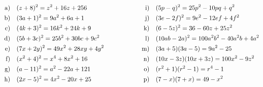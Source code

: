 \begin{exercise}
    {\small
    \begin{alignat*}{5}
      \solutionA & \qquad&\qquad & \solutionI \\
      \solutionB & \qquad&\qquad & \solutionJ \\
      \solutionC & \qquad&\qquad & \solutionK \\
      \solutionD & \qquad&\qquad & \solutionL \\
      \solutionE & \qquad&\qquad & \solutionM \\
      \solutionF & \qquad&\qquad & \solutionN \\
      \solutionG & \qquad&\qquad & \solutionO \\
      \solutionH & \qquad&\qquad & \solutionP
    \end{alignat*}%
    }%

  \fi
\end{exercise}
